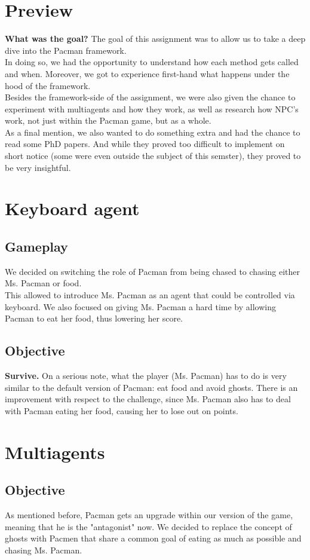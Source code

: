 \documentclass[a4paper,12pt]{report}
\begin{document}
\section{Preview}
\textbf{What was the goal?} The goal of this assignment was to allow us to take a deep dive into the Pacman framework.\\
In doing so, we had the opportunity to understand how each method gets called and when. Moreover, we got to experience first-hand
what happens under the hood of the framework.\\
Besides the framework-side of the assignment, we were also given the chance to experiment with multiagents and how they
work, as well as research how NPC's work, not just within the Pacman game, but as a whole.\\
As a final mention, we also wanted to do something extra and had the chance to read some PhD papers. And while they
proved too difficult to implement on short notice (some were even outside the subject of this semster), they proved to be
very insightful.
\section{Keyboard agent}
\subsection{Gameplay}
We decided on switching the role of Pacman from being chased to chasing either Ms. Pacman or food.\\
This allowed to introduce Ms. Pacman as an agent that could be controlled via keyboard. We also focused
on giving Ms. Pacman a hard time by allowing Pacman to eat her food, thus lowering her score.
\subsection{Objective}
\textbf{Survive.} On a serious note, what the player (Ms. Pacman) has to do is very similar to the default
version of Pacman: eat food and avoid ghosts. There is an improvement with respect to the challenge, since
Ms. Pacman also has to deal with Pacman eating her food, causing her to lose out on points.
\section{Multiagents}
\subsection{Objective}
As mentioned before, Pacman gets an upgrade within our version of the game, meaning that he is the "antagonist"
now. We decided to replace the concept of ghosts with Pacmen that share a common goal of eating as much as possible
and chasing Ms. Pacman.
\end{document}
